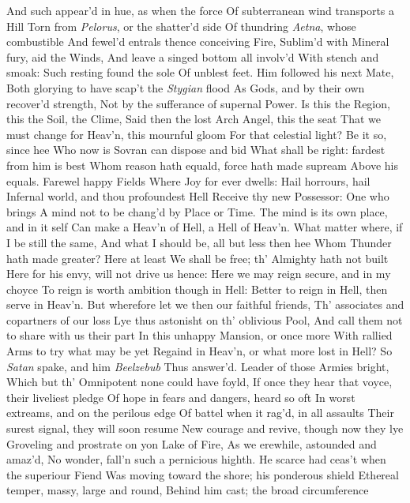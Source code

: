\documentclass[11pt]{book}
\begin{document}
And such appear'd in hue, as when the force 
Of subterranean wind transports a Hill 
Torn from \textit{Pelorus}, or the shatter'd side 
Of thundring \textit{Aetna}, whose combustible 
And fewel'd entrals thence conceiving Fire, 
Sublim'd with Mineral fury, aid the Winds, 
And leave a singed bottom all involv'd 
With stench and smoak: Such resting found the sole 
Of unblest feet.  Him followed his next Mate, 
Both glorying to have scap't the \textit{Stygian} flood 
As Gods, and by their own recover'd strength, 
Not by the sufferance of supernal Power. 
\quad Is this the Region, this the Soil, the Clime, 
Said then the lost Arch Angel, this the seat 
That we must change for Heav'n, this mournful gloom 
For that celestial light?  Be it so, since hee 
Who now is Sovran can dispose and bid 
What shall be right: fardest from him is best 
Whom reason hath equald, force hath made supream 
Above his equals.  Farewel happy Fields 
Where Joy for ever dwells: Hail horrours, hail 
Infernal world, and thou profoundest Hell 
Receive thy new Possessor: One who brings 
A mind not to be chang'd by Place or Time. 
The mind is its own place, and in it self 
Can make a Heav'n of Hell, a Hell of Heav'n. 
What matter where, if I be still the same, 
And what I should be, all but less then hee 
Whom Thunder hath made greater?  Here at least 
We shall be free; th' Almighty hath not built 
Here for his envy, will not drive us hence: 
Here we may reign secure, and in my choyce 
To reign is worth ambition though in Hell: 
Better to reign in Hell, then serve in Heav'n. 
But wherefore let we then our faithful friends, 
Th' associates and copartners of our loss 
Lye thus astonisht on th' oblivious Pool, 
And call them not to share with us their part 
In this unhappy Mansion, or once more 
With rallied Arms to try what may be yet 
Regaind in Heav'n, or what more lost in Hell? 
\quad So \textit{Satan} spake, and him \textit{Beelzebub} 
Thus answer'd.  Leader of those Armies bright, 
Which but th' Omnipotent none could have foyld, 
If once they hear that voyce, their liveliest pledge 
Of hope in fears and dangers, heard so oft 
In worst extreams, and on the perilous edge 
Of battel when it rag'd, in all assaults 
Their surest signal, they will soon resume 
New courage and revive, though now they lye 
Groveling and prostrate on yon Lake of Fire, 
As we erewhile, astounded and amaz'd, 
No wonder, fall'n such a pernicious highth. 
\quad He scarce had ceas't when the superiour Fiend 
Was moving toward the shore; his ponderous shield 
Ethereal temper, massy, large and round, 
Behind him cast; the broad circumference 
\end{document}
